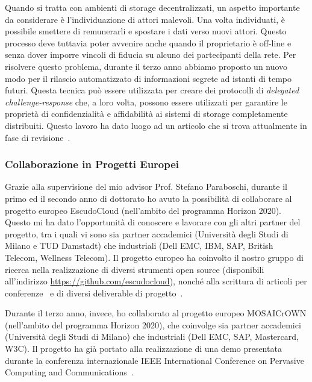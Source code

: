 \documentclass{article}
\begin{document}
\medskip
\noindent Quando si tratta con ambienti di storage decentralizzati, un aspetto importante da considerare è l'individuazione di attori malevoli. Una volta individuati, è possibile smettere di remunerarli e spostare i dati verso nuovi attori. Questo processo deve tuttavia poter avvenire anche quando il proprietario è off-line e senza dover imporre vincoli di fiducia su alcuno dei partecipanti della rete. Per risolvere questo problema, durante il terzo anno abbiamo proposto un nuovo modo per il rilascio automatizzato di informazioni segrete ad istanti di tempo futuri. Questa tecnica può essere utilizzata per creare dei protocolli di {\em delegated challenge-response} che, a loro volta, possono essere utilizzati per garantire le proprietà di confidenzialità e affidabilità ai sistemi di storage completamente distribuiti. Questo lavoro ha dato luogo ad un articolo che si trova attualmente in fase di revisione~\cite{ityt}.

\subsubsection*{Collaborazione in Progetti Europei}

Grazie alla supervisione del mio advisor Prof. Stefano Paraboschi, durante il primo ed il secondo anno di dottorato ho avuto la possibilità di collaborare al progetto europeo EscudoCloud (nell’ambito del programma Horizon 2020). Questo mi ha dato l’opportunità di conoscere e lavorare con gli altri partner del progetto, tra i quali vi sono sia partner accademici (Università degli Studi di Milano e TUD Damstadt) che industriali (Dell EMC, IBM, SAP, British Telecom, Wellness Telecom).
Il progetto europeo ha coinvolto il nostro gruppo di ricerca nella realizzazione di diversi strumenti open source (disponibili all’indirizzo \url{https://github.com/escudocloud}), nonché alla scrittura di articoli per conferenze~\cite{securecomm,wiscs,cscloud,cns,spc} e di diversi deliverable di progetto~\cite{d23,d25,d26,d34,d35,d43,d44}.

\medskip

Durante il terzo anno, invece, ho collaborato al progetto europeo MOSAICrOWN (nell'ambito del programma Horizon 2020), che coinvolge sia partner accademici (Università degli Studi di Milano) che industriali (Dell EMC, SAP, Mastercard, W3C). Il progetto ha già portato alla realizzazione di una demo presentata durante la conferenza internazionale IEEE International Conference on Pervasive Computing and Communications~\cite{percom}.
\end{document}
